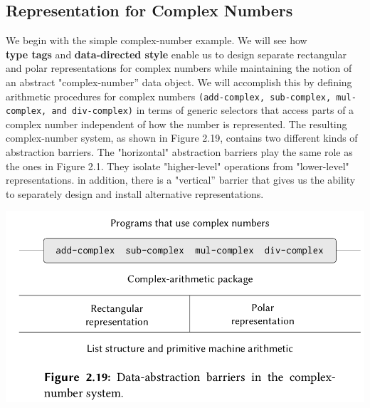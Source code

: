 \documentclass[a4paper,twoside]{article}
\numberwithin{equation}{section}
\begin{document}
\subsection{Representation for Complex Numbers}
We begin with the simple complex-number example. We will see how \\ \textbf{type tags}
and \textbf{data-directed style} enable us to design separate rectangular and polar
representations for complex numbers while maintaining
the notion of an abstract "complex-number” data object. We will accomplish this by defining
arithmetic procedures for complex numbers \texttt{(add-complex, sub-complex, mul-complex, and div-complex)}
in terms of generic selectors that access parts of a complex number independent of how the number
is represented.
The resulting complex-number system, as shown in Figure 2.19, contains two different kinds of
abstraction barriers.
The "horizontal" abstraction barriers play the same role as the ones in Figure 2.1.
They isolate "higher-level" operations from "lower-level" representations.
in addition, there is a "vertical” barrier that gives us the ability to separately
design and install alternative representations.

\begin{center}
    \includegraphics[scale=0.5]{assets/complex_numbers_abs.png}
\end{center}
\end{document}
